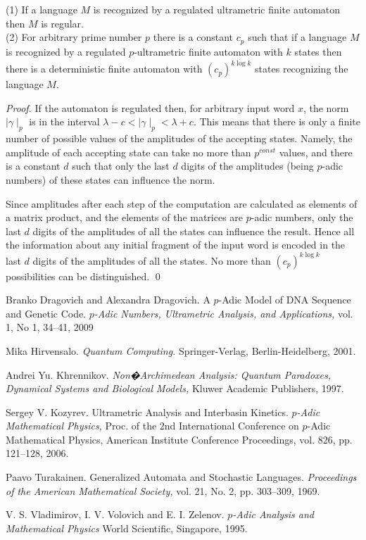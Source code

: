 \documentclass{llncs}
\begin{document}
\begin{theorem}
(1) If a language $M$ is recognized by a regulated ultrametric finite automaton then $M$ is regular.\\
(2) For arbitrary prime number $p$ there is a constant $c_p$ such that if a language $M$ is recognized by a regulated $p$-ultrametric finite automaton with $k$ states then there is a deterministic finite automaton with $(c_p)^{k\dot \log k}$ states recognizing the language $M$.
\end{theorem}
\begin{proof}
If the automaton is regulated then, for arbitrary input word $x$, the norm  $\mid \gamma \mid _p$ is in the interval 
$\lambda -c < \mid\gamma \mid _p < \lambda +c$. This means that there is only a finite number of possible values of the amplitudes of 
the accepting states. Namely, the amplitude of each accepting state can take no more than $p^{const}$ values, and there is a constant $d$ such that
only the last $d$ digits of the amplitudes (being $p$-adic numbers) of these states can influence  the norm.

Since amplitudes after each step
of the computation are calculated as elements of a matrix product, and the elements of the matrices are $p$-adic numbers, only the
 last $d$ digits of the amplitudes of all the states can influence the result. Hence all the information about any initial fragment of 
 the input word is encoded in the last $d$ digits of the amplitudes of all the states. No more than 
 $(c_p)^{k\log k}$ possibilities can be distinguished. \qed
\end{proof}


\begin{thebibliography}{99}

Branko Dragovich and Alexandra Dragovich.
A $p$-Adic Model
of DNA Sequence and Genetic Code.
{\em $p$-Adic Numbers, Ultrametric Analysis, and Applications,}
vol. 1, No 1, 34--41, 2009

Mika Hirvensalo.
{\em Quantum Computing.} Springer-Verlag, Berlin-Heidelberg,  2001.

Andrei Yu. Khrennikov.
{\em Non�Archimedean Analysis: Quantum Paradoxes, Dynamical Systems and
Biological Models,} Kluwer Academic Publishers, 1997.
	
Sergey V. Kozyrev. 
Ultrametric Analysis and Interbasin Kinetics.
{\em $p$-Adic Mathematical Physics,} Proc. of the 2nd International Conference on $p$-Adic 
Mathematical Physics, American Institute Conference Proceedings,
vol. 826, pp. 121--128, 2006.

Paavo Turakainen.
Generalized Automata and Stochastic Languages.
{\em Proceedings of the American Mathematical Society,} vol. 21, No. 2, pp. 303--309, 1969.

V. S. Vladimirov, I. V. Volovich and E. I. Zelenov.
{\em $p$-Adic Analysis and Mathematical Physics} 
World Scientific, Singapore, 1995. 

\end{thebibliography}
\end{document}
